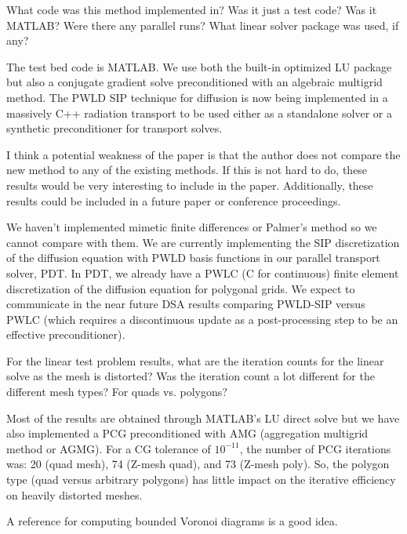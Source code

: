 \documentclass{article}
\begin{document}
\bigskip

{
\color{blue}
What code was this method implemented in? Was it just a test code? Was it MATLAB? Were there any
parallel runs? What linear solver package was used, if any?
}

The test bed code is MATLAB. We use both the built-in optimized LU package but also a conjugate gradient solve
preconditioned with an algebraic multigrid method. The PWLD SIP technique for diffusion is now being 
implemented in a massively C++ radiation transport to be used either as a standalone solver or a 
synthetic preconditioner for transport solves. 



\bigskip


{
\color{blue}
I think a potential weakness of the paper is that the author does not compare the new method to any of
the existing methods. If this is not hard to do, these results would be very interesting to include in the
paper. Additionally, these results could be included in a future paper or conference proceedings.
}

We haven't implemented mimetic finite differences or Palmer's method so we cannot compare with them. We are
currently implementing the SIP discretization of the diffusion equation with PWLD basis functions 
in our parallel transport solver, PDT.  In PDT, we already have a PWLC (C for continuous)
finite element discretization of the diffusion equation for polygonal grids. We expect to communicate in the near
future DSA results comparing PWLD-SIP versus PWLC (which requires a discontinuous update as a post-processing step to
be an effective preconditioner).
 \bigskip


{
\color{blue}
For the linear test problem results, what are the iteration counts for the linear solve as the mesh is
distorted? Was the iteration count a lot different for the different mesh types? For quads vs. polygons?
}


Most of the results are obtained through MATLAB's LU direct solve but we have also implemented a PCG preconditioned with AMG 
(aggregation multigrid method or AGMG). For a CG tolerance of $10^{-11}$, the number of PCG iterations was: 20 (quad mesh),
74 (Z-mesh quad), and 73 (Z-mesh poly). So, the polygon type (quad versus arbitrary polygons) has little impact on
the iterative efficiency on heavily distorted meshes.
\bigskip


{
\color{blue}
A reference for computing bounded Voronoi diagrams is a good idea.
}
\end{document}

